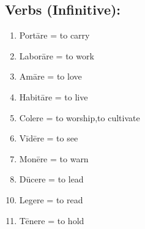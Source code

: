 \subsection*{Verbs (Infinitive):}
\begin{minipage}[t]{0.48\linewidth}
  \begin{enumerate}
    \item Portāre = to carry 
    \item Laborāre = to work 
    \item Amāre = to love 
    \item Habitāre = to live 
    \item Colere = to worship,to cultivate
    \item Vīdēre = to see 
    \item Monēre = to warn 
    \item Dūcere = to lead 
  \end{enumerate} 
\end{minipage}
\hfill
\begin{minipage}[t]{0.48\linewidth}
  \begin{enumerate} 
    \setcounter{enumi}{9}
    \item Legere = to read 
    \item Tēnere = to hold
  \end{enumerate} 
\end{minipage}
\newpage

